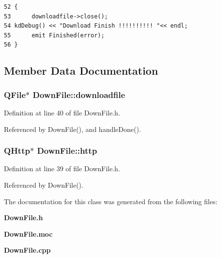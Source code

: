 \footnotesize\begin{verbatim}52 {
53      downloadfile->close();
54 kdDebug() << "Download Finish !!!!!!!!!! "<< endl; 
55      emit Finished(error);        
56 }
\end{verbatim}\normalsize 


\subsection{Member Data Documentation}
\subsubsection{\setlength{\rightskip}{0pt plus 5cm}QFile$\ast$ {\bf Down\-File::downloadfile}}\label{classDownFile_DownFileo1}




Definition at line 40 of file Down\-File.h.

Referenced by Down\-File(), and handle\-Done().
\subsubsection{\setlength{\rightskip}{0pt plus 5cm}QHttp$\ast$ {\bf Down\-File::http}}\label{classDownFile_DownFileo0}




Definition at line 39 of file Down\-File.h.

Referenced by Down\-File().

The documentation for this class was generated from the following files:\begin{CompactItemize}
\item 
{\bf Down\-File.h}\item 
{\bf Down\-File.moc}\item 
{\bf Down\-File.cpp}\end{CompactItemize}
